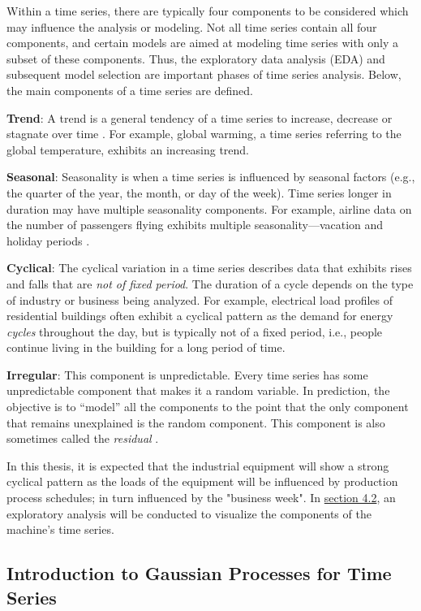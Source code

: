Within a time series, there are typically four components to be considered which may influence the analysis or modeling. Not all time series contain all four components, and certain models are aimed at modeling time series with only a subset of these components. Thus, the exploratory data analysis (EDA) and subsequent model selection are important phases of time series analysis. Below, the main components of a time series are defined.

\textbf{Trend}: A trend is a general tendency of a time series to increase, decrease or stagnate over time \cite{tsa}. For example, global warming, a time series referring to the global temperature, exhibits an increasing trend. 

\textbf{Seasonal}: Seasonality is when a time series is influenced by seasonal factors (e.g., the quarter of the year, the month, or day of the week). Time series longer in duration may have multiple seasonality components. For example, airline data on the number of passengers flying exhibits multiple seasonality—vacation and holiday periods \cite{tsa}.

\textbf{Cyclical}: The cyclical variation in a time series describes data that exhibits rises and falls that are \textit{not of fixed period}. The duration of a cycle depends on the type of industry or business being analyzed. For example, electrical load profiles of residential buildings often exhibit a cyclical pattern as the demand for energy \textit{cycles} throughout the day, but is typically not of a fixed period, i.e., people continue living in the building for a long period of time. 

\textbf{Irregular}: This component is unpredictable. Every time series has some unpredictable component that makes it a random variable. In prediction, the objective is to “model” all the components to the point that the only component that remains unexplained is the random component. This component is also sometimes called the \textit{residual} \cite{tsa}. 

In this thesis, it is expected that the industrial equipment will show a strong cyclical pattern as the loads of the equipment will be influenced by production process schedules; in turn influenced by the "business week". In \hyperlink{subsection.4.2}{section 4.2}, an exploratory analysis will be conducted to visualize the components of the machine's time series. 


\subsection{Introduction to Gaussian Processes for Time Series}

